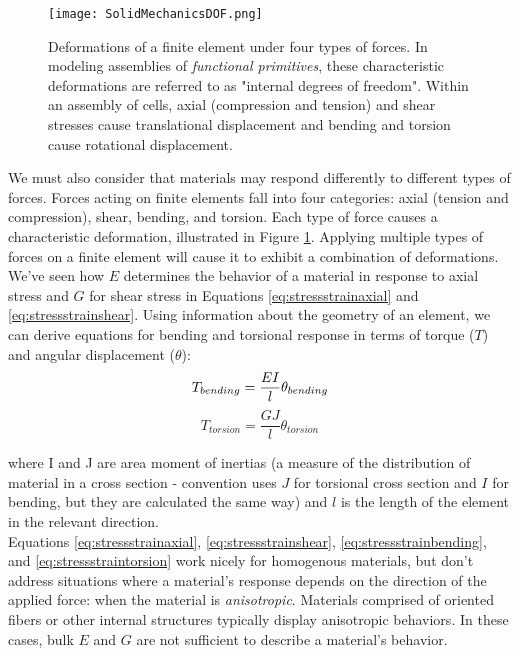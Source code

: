 {\begin{figure}
  \texttt{[image: SolidMechanicsDOF.png]}
  \caption{Deformations of a finite element under four types of forces.  In modeling assemblies of \textit{functional primitives}, these characteristic deformations are referred to as "internal degrees of freedom".  Within an assembly of cells, axial (compression and tension) and shear stresses cause translational displacement and bending and torsion cause rotational displacement.}
  \label{fig:SolidMechanicsDOF}
\end{figure}

We must also consider that materials may respond differently to different types of forces.  Forces acting on finite elements fall into four categories: axial (tension and compression), shear, bending, and torsion.  Each type of force causes a characteristic deformation, illustrated in Figure \ref{fig:SolidMechanicsDOF}.  Applying multiple types of forces on a finite element will cause it to exhibit a combination of deformations.  We've seen how $E$ determines the behavior of a material in response to axial stress and $G$ for shear stress in Equations \ref{eq:stressstrainaxial} and  \ref{eq:stressstrainshear}.  Using information about the geometry of an element, we can derive equations for bending and torsional response in terms of torque ($T$) and angular displacement ($\theta$):
\begin{equation}\label{eq:stressstrainbending}
T_{bending} = \dfrac{EI}{l}\theta_{bending}\\[10pt]
\end{equation}
\begin{equation}\label{eq:stressstraintorsion}
T_{torsion} = \dfrac{GJ}{l}\theta_{torsion}
\end{equation}

where I and J are area moment of inertias (a measure of the distribution of material in a cross section - convention uses $J$ for torsional cross section and $I$ for bending, but they are calculated the same way) and $l$ is the length of the element in the relevant direction.\\

Equations \ref{eq:stressstrainaxial}, \ref{eq:stressstrainshear}, \ref{eq:stressstrainbending}, and \ref{eq:stressstraintorsion} work nicely for homogenous materials, but don't address situations where a material's response depends on the direction of the applied force: when the material is \textit{anisotropic}.  Materials comprised of oriented fibers or other internal structures typically display anisotropic behaviors.  In these cases, bulk $E$ and $G$ are not sufficient to describe a material's behavior.

}
